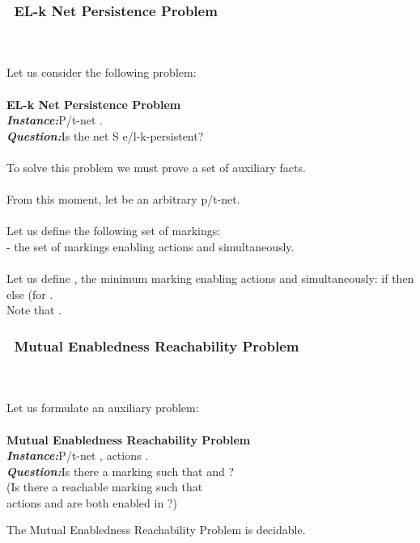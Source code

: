 \documentclass[a4paper]{llncs}
\begin{document}
\subsubsection{\textbullet \ EL-k Net Persistence Problem}\mbox{ }\\ 
\\
Let us consider the following problem:
\\ \\
\textbf{EL-k Net Persistence Problem}
\\
\indent\textbf{\emph{Instance:}}P/t-net .\\
\indent\textbf{\emph{Question:}}Is the net S e/l-k-persistent?
\\
\\To solve this problem we must prove a set of auxiliary facts.
\\ \\
From this moment, let  be an arbitrary p/t-net.
\\ \\
Let us define the following set of markings:\\
- the set of markings enabling actions  and  simultaneously. \\ 
\\
Let us define , the minimum marking enabling actions  and  simultaneously: if  then  else  (for .\\
Note that .

\subsubsection{\textbullet \ Mutual Enabledness Reachability Problem}\mbox{ }\\
\\
Let us formulate an auxiliary problem:
\\ \\
\textbf{Mutual Enabledness Reachability Problem}
\\
\indent\textbf{\emph{Instance:}}P/t-net , actions .\\
\indent\textbf{\emph{Question:}}Is there a marking  such that  and  ? \\
\indent(Is there a reachable marking  such that \\ \indent actions  and  are both enabled in ?)
\\

\begin{theorem}
\label{t413}
The Mutual Enabledness Reachability Problem is decidable.
\end{theorem}
\end{document}
